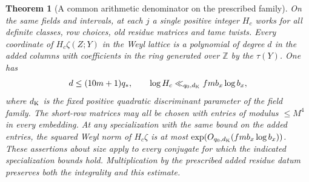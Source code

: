 \documentclass[a4paper,11pt]{article}
\newtheorem{theorem}[proposition]{Theorem}
\theoremstyle{definition}
\theoremstyle{remark}
\newcommand{\ZZ}{\mathbb Z}\newcommand{\ord}{\operatorname{ord}}
\numberwithin{equation}{section}
\begin{document}
\begin{theorem}[A common arithmetic denominator on the prescribed family]
\leavevmode\label{thm:stackedheight819}
On the same fields and intervals, at each \(j\) a single
positive integer \(H_c\) works for all definite classes,
row choices, old residue matrices and tame twists. Every
coordinate of \(H_c\zeta(Z;Y)\) in the Weyl lattice is a
polynomial of degree \(d\) in the added columns with
coefficients in the ring generated over \(\ZZ\) by the
\(\tau(Y)\). One has
\[
     d\le(10m+1)q_*,\qquad
     \log H_c\ll_{q_0,d_{\rm K}} f m b_x\log b_x ,
\]
where \(d_{\rm K}\) is the fixed positive quadratic
discriminant parameter of the field family. The short-row
matrices may all be chosen with entries of modulus
\(\le M^4\) in every embedding. At any specialization
with the same bound on the added entries, the squared
Weyl norm of \(H_c\zeta\) is at most
\(\exp(O_{q_0,d_{\rm K}}(f m b_x\log b_x))\).
These assertions about size apply to every conjugate
for which the indicated specialization bounds hold.
Multiplication by the prescribed added residue datum
preserves both the integrality and this estimate.
\end{theorem}
\end{document}
